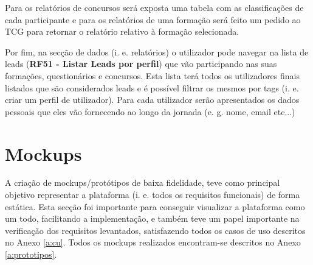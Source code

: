 Para os relatórios de concursos será exposta uma tabela com as classificações de cada participante e para os relatórios de uma formação será feito um pedido ao TCG para retornar o relatório relativo à formação selecionada.

Por fim, na secção de dados (i. e. relatórios) o utilizador pode navegar na lista de leads (\textbf{RF51 - Listar Leads por perfil}) que vão participando nas suas formações, questionários e concursos. Esta lista terá todos os utilizadores finais listados que são considerados leads e é possível filtrar os mesmos por tags (i. e. criar um perfil de utilizador). Para cada utilizador serão apresentados os dados pessoais que eles vão fornecendo ao longo da jornada (e. g. nome, email etc...)




\section{Mockups}
\label{prototipagem}

A criação de mockups/protótipos de baixa fidelidade, teve como principal objetivo representar a plataforma (i. e. todos os requisitos funcionais) de forma estática. Esta secção foi importante para conseguir visualizar a plataforma como um todo, facilitando a implementação, e também teve um papel importante na verificação dos requisitos levantados, satisfazendo todos os casos de uso descritos no Anexo \ref{a:cu}. Todos os mockups realizados encontram-se descritos no Anexo \ref{a:prototipos}.


\blankpage

\glsresetall